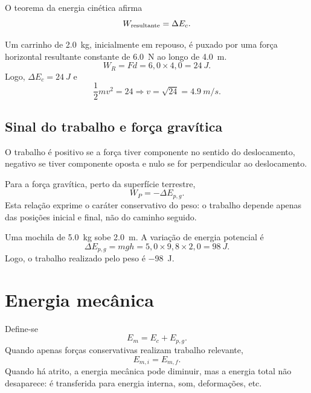 \documentclass[11pt,a4paper,oneside]{book}
\newcommand{\vect}[1]{\boldsymbol{#1}}
\begin{document}
O teorema da energia cinética afirma
\[
W_{\rm resultante}=\Delta E_c.
\]

\begin{center}
\end{center}

\begin{exemplo}
Um carrinho de \SI{2.0}{kg}, inicialmente em repouso, é puxado por uma força horizontal resultante constante de \SI{6.0}{N} ao longo de \SI{4.0}{m}.
\[
W_R=Fd=6{,}0\times4{,}0=\SI{24}{J}.
\]
Logo, $\Delta E_c=\SI{24}{J}$ e
\[
\frac12 mv^2=24 \Rightarrow v=\sqrt{24}=\SI{4.9}{m/s}.
\]
\end{exemplo}

\subsection*{Sinal do trabalho e força gravítica}
O trabalho é positivo se a força tiver componente no sentido do deslocamento, negativo se tiver componente oposta e nulo se for perpendicular ao deslocamento.

Para a força gravítica, perto da superfície terrestre,
\[
W_P=-\Delta E_{p,g}.
\]
Esta relação exprime o caráter conservativo do peso: o trabalho depende apenas das posições inicial e final, não do caminho seguido.

\begin{exemplo}[title=Exemplo resolvido -- subida e trabalho do peso]
Uma mochila de \SI{5.0}{kg} sobe \SI{2.0}{m}. A variação de energia potencial é
\[
\Delta E_{p,g}=mgh=5{,}0\times9{,}8\times2{,}0=\SI{98}{J}.
\]
Logo, o trabalho realizado pelo peso é \SI{-98}{J}.
\end{exemplo}

\section{Energia mecânica}
Define-se
\[
E_m=E_c+E_{p,g}.
\]
Quando apenas forças conservativas realizam trabalho relevante,
\[
E_{m,i}=E_{m,f}.
\]
Quando há atrito, a energia mecânica pode diminuir, mas a energia total não desaparece: é transferida para energia interna, som, deformações, etc.
\end{document}
